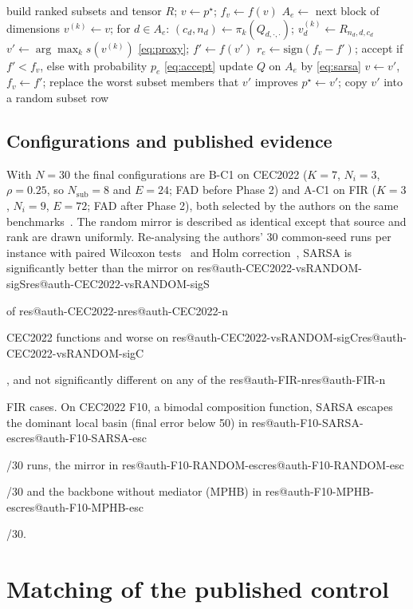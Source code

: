 \documentclass[11pt]{article}
\makeatletter
\theoremstyle{definition}
\theoremstyle{remark}
\renewcommand\res[1]{\ifcsname res@#1\endcsname\csname res@#1\endcsname\else\PackageError{res}{Undefined result key #1}{}\fi}
\makeatother
\begin{document}
\begin{algorithm}[t]
\caption{Mediator (Phase 2) of MPHBS. The random arms replace line~\ref{line:policy} by uniform draws and skip
line~\ref{line:sarsa}.}
\label{alg:mediator}
\small
\begin{algorithmic}[1]
\State build ranked subsets and tensor $R$; $v\gets p^\star$; $f_v\gets f(v)$ 
  \State $A_e\gets$ next block of dimensions
    \State $v^{(k)}\gets v$; for $d\in A_e$: $(c_d,n_d)\gets\pi_k(Q_{d,\cdot,\cdot})$; $v^{(k)}_d\gets R_{n_d,d,c_d}$
    \label{line:policy}
  \EndFor
  \State $v'\gets\arg\max_k s(v^{(k)})$ \eqref{eq:proxy}; $f'\gets f(v')$ 
  \State $r_e\gets\mathrm{sign}(f_v-f')$; accept if $f'<f_v$, else with probability $p_e$ \eqref{eq:accept}
  \State update $Q$ on $A_e$ by \eqref{eq:sarsa} \label{line:sarsa}
   $v\gets v'$, $f_v\gets f'$; replace the worst subset members that $v'$ improves\EndIf
   $p^\star\gets v'$; copy $v'$ into a random subset row\EndIf
\EndFor
\end{algorithmic}
\end{algorithm}

\subsection{Configurations and published evidence}
With $N=30$ the final configurations are B-C1 on CEC2022 ($K=7$, $N_i=3$, $\rho=0.25$, so $N_\mathrm{sub}=8$ and
$E=24$; FAD before Phase 2) and A-C1 on FIR ($K=3$, $N_i=9$, $E=72$; FAD after Phase 2), both selected by the authors
on the same benchmarks~\citep{flores2026mphbs}. The random mirror is described as identical except that source and rank
are drawn uniformly. Re-analysing the authors' 30 common-seed runs per instance with paired Wilcoxon
tests~\citep{wilcoxon1945} and Holm correction~\citep{holm1979}, SARSA is significantly better than the mirror on
\res{auth-CEC2022-vsRANDOM-sigS} of \res{auth-CEC2022-n} CEC2022 functions and worse on
\res{auth-CEC2022-vsRANDOM-sigC}, and not significantly different on any of the \res{auth-FIR-n} FIR cases. On CEC2022
F10, a bimodal composition function, SARSA escapes the dominant local basin (final error below 50) in
\res{auth-F10-SARSA-esc}/30 runs, the mirror in \res{auth-F10-RANDOM-esc}/30 and the backbone without mediator (MPHB) in
\res{auth-F10-MPHB-esc}/30.

\section{Matching of the published control}
\label{sec:control}
\end{document}
